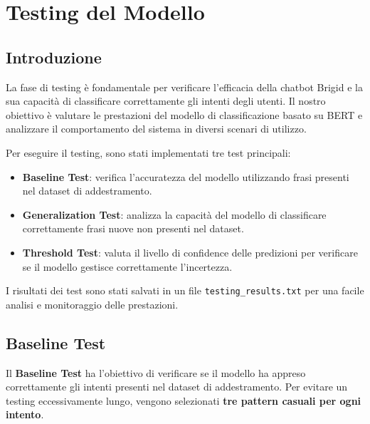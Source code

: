 \documentclass[12pt, letterpaper]{article}
\begin{document}
\newpage
\section{Testing del Modello}

\subsection{Introduzione}
La fase di testing è fondamentale per verificare l'efficacia della chatbot Brigid e la sua capacità di classificare correttamente gli intenti degli utenti. Il nostro obiettivo è valutare le prestazioni del modello di classificazione basato su BERT e analizzare il comportamento del sistema in diversi scenari di utilizzo.

Per eseguire il testing, sono stati implementati tre test principali:
\begin{itemize}
	\item \textbf{Baseline Test}: verifica l'accuratezza del modello utilizzando frasi presenti nel dataset di addestramento.
	\item \textbf{Generalization Test}: analizza la capacità del modello di classificare correttamente frasi nuove non presenti nel dataset.
	\item \textbf{Threshold Test}: valuta il livello di confidence delle predizioni per verificare se il modello gestisce correttamente l'incertezza.
\end{itemize}
I risultati dei test sono stati salvati in un file \texttt{testing\_results.txt} per una facile analisi e monitoraggio delle prestazioni.

\subsection{Baseline Test}

Il \textbf{Baseline Test} ha l'obiettivo di verificare se il modello ha appreso correttamente gli intenti presenti nel dataset di addestramento. Per evitare un testing eccessivamente lungo, vengono selezionati \textbf{tre pattern casuali per ogni intento}.
\end{document}

